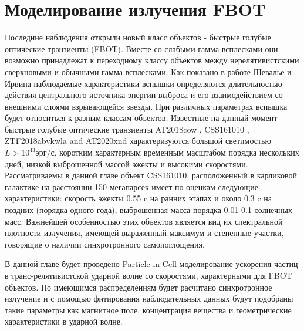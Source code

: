 \chapter{Моделирование излучения FBOT}\label{FBOT}

Последние наблюдения открыли новый класс объектов - быстрые голубые оптические транзиенты (FBOT)\cite{Drout2014, Margutti2014, Coppejans2020, Ho2020}. Вместе со слабыми гамма-всплесками они возможно принадлежат к переходному классу объектов между нерелятивистскими сверхновыми и обычными гамма-всплесками. Как показано в работе Шевалье и Ирвина \cite{Chevalier2011} наблюдаемые характеристики вспышки определяются длительностью действия центрального источника энергии выброса и его взаимодействием со внешними слоями взрывающейся звезды. При различных параметрах вспышка будет относиться к разным классам объектов. Известные на данный момент быстрые голубые оптические транзиенты AT2018cow \cite{Margutti2014}, CSS161010 \cite{Coppejans2020}, ZTF2018abvkwla \cite{Ho2020} and AT2020xnd \cite{Ho2021, Bright2021} характеризуются большой светимостью $L > 10^43 эрг/с$, коротким характерным временным масштабом порядка нескольких дней, низкой выброшенной массой эжекты и высокими скоростями.
Рассматриваемы в данной главе объект CSS161010, расположенный в карликовой галактике на расстоянии 150 мегапарсек имеет по оценкам следующие\cite{Coppejans2020} характеристики: скорость эжекты 0.55 c на ранних этапах и около 0.3 c на поздних (порядка одного года), выброшенная масса порядка 0.01-0.1 солнечных масс. Важнейшей особенностью этих объектов является вид их спектральной плотности излучения, имеющей выраженный максимум и степенные участки, говорящие о наличии синхротронного самопоглощения.


В данной главе будет проведено Particle-in-Cell моделирование ускорения частиц в транс-релятивистской ударной волне со скоростями, характерными для FBOT объектов. По имеющимся распределениям будет расчитано синхротронное излучение и с помощью фитирования наблюдательных данных будут подобраны такие параметры как магнитное поле, концентрация вещества и геометрические характеристики в ударной волне.

